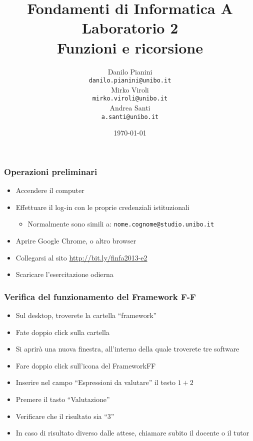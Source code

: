 \documentclass{beamer}
\begin{document}
\title[Lab1 - FV]{Fondamenti di Informatica A \\ Laboratorio 2 \\ Funzioni e ricorsione}
\author[Danilo Pianini]{Danilo Pianini\\\texttt{danilo.pianini@unibo.it} \\ \vspace{3pt} Mirko Viroli\\\texttt{mirko.viroli@unibo.it} \\ \vspace{3pt} Andrea Santi\\\texttt{a.santi@unibo.it} }
\date[\today]{\today}

\frame{\titlepage} 

\begin{frame}
\frametitle{Operazioni preliminari}
\begin{itemize}
 \item Accendere il computer
 \item Effettuare il log-in con le proprie credenziali istituzionali
  \begin{itemize}
    \item Normalmente sono simili a: \texttt{nome.cognome@studio.unibo.it}
  \end{itemize}
 \item Aprire Google Chrome, o altro browser
 \item Collegarsi al sito \url{http://bit.ly/finfa2013-e2}
 \item Scaricare l'esercitazione odierna
\end{itemize}
\end{frame}

\begin{frame}
\frametitle{Verifica del funzionamento del Framework F-F}
\begin{itemize}
 \item Sul desktop, troverete la cartella ``framework''
 \item Fate doppio click sulla cartella
 \item Si aprirà una nuova finestra, all'interno della quale troverete tre software
 \item Fare doppio click sull'icona del FrameworkFF
 \item Inserire nel campo ``Espressioni da valutare'' il testo \texttt{$1+2$}
 \item Premere il tasto ``Valutazione''
 \item Verificare che il risultato sia ``3''
 \item In caso di risultato diverso dalle attese, chiamare subito il docente o il tutor
\end{itemize}
\end{frame}
\end{document}
